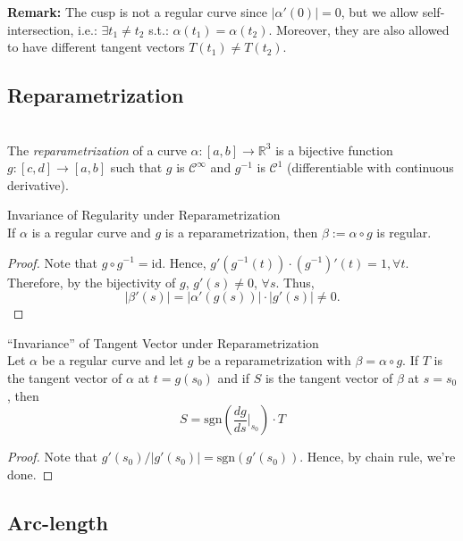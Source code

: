 \noindent\textbf{Remark:} The cusp is not a regular curve since $|\alpha'(0)|=0$, but we allow self-intersection, i.e.: $\exists t_1\neq t_2$ s.t.: $\alpha(t_1)=\alpha(t_2)$. Moreover, they are also allowed to have different tangent vectors $T(t_1)\neq T(t_2)$.

\subsection{Reparametrization}

\\
The \textit{reparametrization} of a curve $\alpha:[a,b]\to\mathbb{R}^3$ is a bijective function $g:[c,d]\to[a,b]$ such that $g$ is $\mathcal{C}^\infty$ and $g^{-1}$ is $\mathcal{C}^1$ (differentiable with continuous derivative).

\begin{proposition}{Invariance of Regularity under Reparametrization}\\
If $\alpha$ is a regular curve and $g$ is a reparametrization, then $\beta := \alpha\circ g$ is regular.
\end{proposition}

\begin{proof}
Note that $g\circ g^{-1} = \mathrm{id}$. Hence, $g'(g^{-1}(t))\cdot(g^{-1})'(t) = 1, \forall t$. Therefore, by the bijectivity of $g$, $g'(s)\neq 0$, $\forall s$. Thus,
\[
|\beta'(s)| = |\alpha'(g(s))|\cdot|g'(s)| \neq 0.
\]
\end{proof}

\begin{proposition}{``Invariance'' of Tangent Vector under Reparametrization}\\
Let $\alpha$ be a regular curve and let $g$ be a reparametrization with $\beta = \alpha\circ g$. If $T$ is the tangent vector of $\alpha$ at $t = g(s_0)$ and if $S$ is the tangent vector of $\beta$ at $s = s_0$, then
\[
S = \mathrm{sgn}\left(\frac{dg}{ds}\bigg|_{s_0}\right)\cdot T
\]
\end{proposition}

\begin{proof}
Note that $g'(s_0)/|g'(s_0)| = \mathrm{sgn}(g'(s_0))$. Hence, by chain rule, we're done.
\end{proof}

\subsection{Arc-length}

